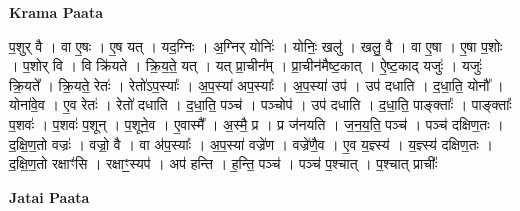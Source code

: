 \documentclass[17pt]{extarticle}
\begin{document}
\textbf{Krama Paata} \newline

प॒शुर् वै । वा ए॒षः । ए॒ष यत् । यद॒ग्निः । अ॒ग्निर् योनिः॑ । योनिः॒ खलु॑ । खलु॒ वै । वा ए॒षा । ए॒षा प॒शोः । प॒शोर् वि । वि क्रि॑यते । क्रि॒य॒ते॒ यत् । यत् प्रा॒चीन᳚म् । प्रा॒चीन॑मैष्ट॒कात् । ऐ॒ष्ट॒काद् यजुः॑ । यजुः॑ क्रि॒यते᳚ । क्रि॒यते॒ रेतः॑ । रेतो॑ऽप॒स्याः᳚ । अ॒प॒स्या॑ अप॒स्याः᳚ । अ॒प॒स्या॑ उप॑ । उप॑ दधाति । द॒धा॒ति॒ योनौ᳚ । योना॑वे॒व । ए॒व रेतः॑ । रेतो॑ दधाति । द॒धा॒ति॒ पञ्च॑ । पञ्चोप॑ । उप॑ दधाति । द॒धा॒ति॒ पाङ्क्ताः᳚ । पाङ्क्ताः᳚ प॒शवः॑ । प॒शवः॑ प॒शून् । प॒शूने॒व । ए॒वास्मै᳚ । अ॒स्मै॒ प्र । प्र ज॑नयति । ज॒न॒य॒ति॒ पञ्च॑ । पञ्च॑ दक्षिण॒तः । द॒क्षि॒ण॒तो वज्रः॑ । वज्रो॒ वै । वा अ॑प॒स्याः᳚ । अ॒प॒स्या॑ वज्रे॑ण । वज्रे॑णै॒व । ए॒व य॒ज्ञ्स्य॑ । य॒ज्ञ्स्य॑ दक्षिण॒तः । द॒क्षि॒ण॒तो रक्षाꣳ॑सि । रक्षाꣳ॒॒स्यप॑ । अप॑ हन्ति । ह॒न्ति॒ पञ्च॑ । पञ्च॑ प॒श्चात् । प॒श्चात् प्राचीः᳚ \newline

\textbf{Jatai Paata} \newline
\end{document}
